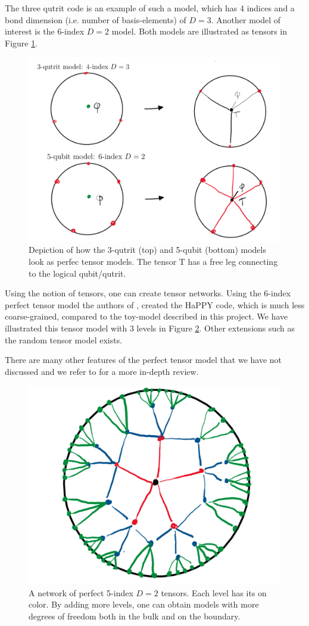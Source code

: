 \documentclass[letter,12pt]{article}
\begin{document}
The three qutrit code is an example of such a model, which has 4 indices and a bond dimension (i.e. number of basis-elements) of $D=3$.
Another model of interest is the 6-index $D=2$ model. Both models are illustrated as tensors in Figure \ref{fig:adscftfig8}.
\begin{figure}[htb]
	\centering
	\includegraphics[width=0.95\linewidth]{ADS_CFT_Fig8}
	\caption{Depiction of how the 3-qutrit (top) and 5-qubit (bottom) models look as perfec tensor models. The tensor T has a free leg connecting to the logical qubit/qutrit.}
	\label{fig:adscftfig8}
\end{figure}

 Using the notion of tensors, one can create tensor networks. Using the 6-index perfect tensor model the authors of \cite{bib3}, created the HaPPY code, which is much less coarse-grained, compared to the toy-model described in this project. We have illustrated this tensor model with 3 levels in Figure \ref{fig:adscftfig10}. Other extensions such as the random tensor model exists. 
 
 There are many other features of the perfect tensor model that we have not discussed and we refer to \cite{bib1} for a more in-depth review.
 \begin{figure}[H]
 	\centering
 	\includegraphics[width=0.35\linewidth]{ADS_CFT_Fig10}
 	\caption{A network of perfect 5-index $D=2$ tensors. Each level has its on color. By adding more levels, one can obtain models with more degrees of freedom both in the bulk and on the boundary.}
 	\label{fig:adscftfig10}
 \end{figure}
\end{document}
